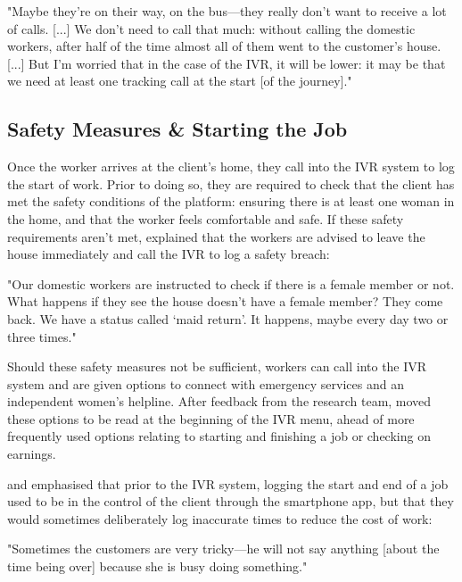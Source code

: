 \begin{displayquote}
"Maybe they’re on their way, on the bus---they really don’t want to receive a lot of calls. [...] We don’t need to call that much: without calling the domestic workers, after half of the time almost all of them went to the customer’s house. [...] But I’m worried that in the case of the IVR, it will be lower: it may be that we need at least one tracking call at the start [of the journey]."
\end{displayquote}

\subsection{Safety Measures \& Starting the Job}

Once the worker arrives at the client’s home, they call into the IVR system to log the start of work. Prior to doing so, they are required to check that the client has met the safety conditions of the platform: ensuring there is at least one woman in the home, and that the worker feels comfortable and safe. If these safety requirements aren't met, \PC{} explained that the workers are advised to leave the house immediately and call the IVR to log a safety breach: 

\begin{displayquote}
"Our domestic workers are instructed to check if there is a female member or not. What happens if they see the house doesn't have a female member? They come back. We have a status called ‘maid return’. It happens, maybe every day two or three times."
\end{displayquote}

Should these safety measures not be sufficient, workers can call into the IVR system and are given options to connect with emergency services and an independent women's helpline. After feedback from the research team, \PC{} moved these options to be read at the beginning of the IVR menu, ahead of more frequently used options relating to starting and finishing a job or checking on earnings. 

\PC{} and \NGO{} emphasised that prior to the IVR system, logging the start and end of a job used to be in the control of the client through the smartphone app, but that they would sometimes deliberately log inaccurate times to reduce the cost of work:

\begin{displayquote}
"Sometimes the customers are very tricky---he will not say anything [about the time being over] because she is busy doing something."
\end{displayquote}

